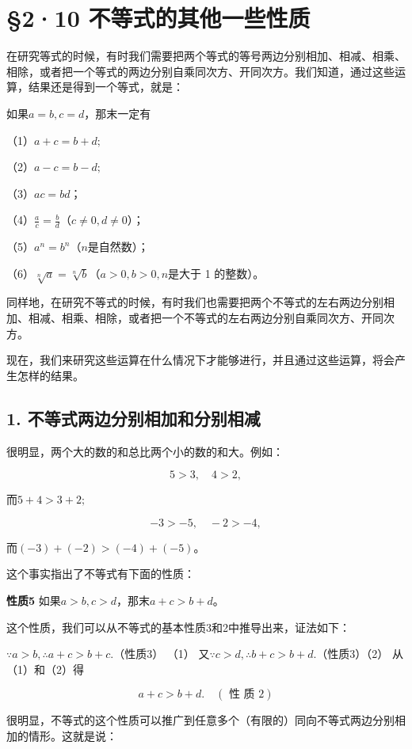 \section{§2·10 不等式的其他一些性质}

在研究等式的时候，有时我们需要把两个等式的等号两边分别相加、相减、相乘、相除，或者把一个等式的两边分别自乘同次方、开同次方。我们知道，通过这些运算，结果还是得到一个等式，就是：

如果\(a = b, c = d\)，那末一定有

（1）\(a + c = b + d;\)

（2）\(a - c = b - d;\)

（3）\(ac=bd\)；

（4）\(\frac{a}{c} = \frac{b}{d}\)（\(c \neq 0, d \neq 0\)）；

（5）\(a^{n}=b^{n}\)（\(n\)是自然数）；

（6）\(\sqrt[n]{a} = \sqrt[n]{b}\)（\(a > 0, b > 0, n\)是大于 1
的整数）。

同样地，在研究不等式的时候，有时我们也需要把两个不等式的左右两边分别相加、相减、相乘、相除，或者把一个不等式的左右两边分别自乘同次方、开同次方。

现在，我们来研究这些运算在什么情况下才能够进行，并且通过这些运算，将会产生怎样的结果。

\subsection{1. 不等式两边分别相加和分别相减}

很明显，两个大的数的和总比两个小的数的和大。例如：

\[
5 > 3, \quad 4 > 2,
\]

而\(5 + 4 > 3 + 2;\)

\[
- 3 > - 5, \quad - 2 > - 4,
\]

而\((-3) + (-2) > (-4) + (-5)\)。

这个事实指出了不等式有下面的性质：

\textbf{性质5} 如果\(a > b, c > d\)，那末\(a + c > b + d\)。

这个性质，我们可以从不等式的基本性质3和2中推导出来，证法如下：

 \(\because a > b, \therefore a + c > b + c.\)（性质3）
（1） 又\(\because c > d, \therefore b + c > b + d.\)（性质3）（2）
从（1）和（2）得

\[
a + c > b + d. \quad (\text{ 性 质 } 2)
\]

很明显，不等式的这个性质可以推广到任意多个（有限的）同向不等式两边分别相加的情形。这就是说：

